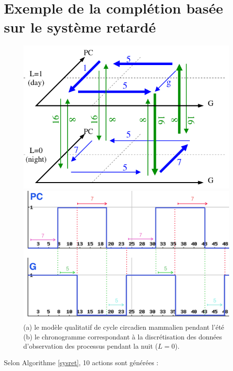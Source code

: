 \documentclass[11pt]{report}
\theoremstyle{definition}
\begin{document}
\chapter{Exemple de la compl\'etion bas\'ee sur le syst\`eme retard\'e}

\begin{figure}[ht]
\centering
\begin{minipage}{0.4\linewidth}
\includegraphics[width=1\textwidth]{Delayed1.png}
\caption*{(a)}
\end{minipage}
\begin{minipage}{0.4\linewidth}
\includegraphics[width=1\textwidth]{Delayed2.png}
\caption*{(b)}
\end{minipage}
\caption{(a) le mod\`ele qualitatif de cycle circadien mammalien pendant l'\'et\'e (b) le chronogramme correspondant \`a la discr\'etisation des donn\'ees d'observation des processus pendant la nuit ($L=0$).}\label{mammal}
\end{figure}
Selon Algorithme \ref{sysret}, 10 actions sont g\'en\'er\'ees : 
\end{document}
